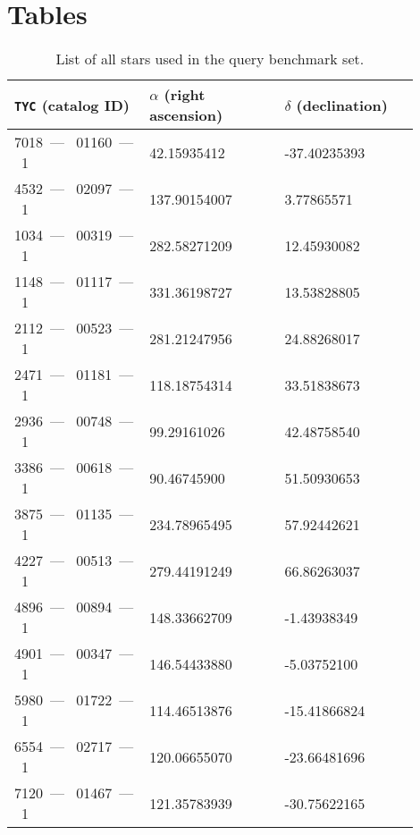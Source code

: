 \documentclass[11pt]{article}
\begin{document}
    \newpage
    \section{Tables}\label{sec:tables}
        \begin{table}[h]
        \begin{center}
            \caption{
                List of all stars used in the query benchmark set.
            } \label{tab:starsInQueries}
            \begin{tabular}{ | m{0.3\linewidth} || m{0.3\linewidth} | m{0.3\linewidth} | }
                \hline
                \texttt{TYC} (catalog ID) & $\alpha$ (right ascension) & $\delta$ (declination) \\
                \hline \hline
                7018\ --- \ 01160\ --- \ 1 & 42.15935412 & -37.40235393 \\ \hline
                4532\ --- \ 02097\ --- \ 1 & 137.90154007 & 3.77865571 \\ \hline
                1034\ --- \ 00319\ --- \ 1 & 282.58271209 & 12.45930082 \\ \hline
                1148\ --- \ 01117\ --- \ 1 & 331.36198727 & 13.53828805 \\ \hline
                2112\ --- \ 00523\ --- \ 1 & 281.21247956 & 24.88268017 \\ \hline
                2471\ --- \ 01181\ --- \ 1 & 118.18754314 & 33.51838673 \\ \hline
                2936\ --- \ 00748\ --- \ 1 & 99.29161026 & 42.48758540 \\ \hline
                3386\ --- \ 00618\ --- \ 1 & 90.46745900 & 51.50930653 \\ \hline
                3875\ --- \ 01135\ --- \ 1 & 234.78965495 & 57.92442621 \\ \hline
                4227\ --- \ 00513\ --- \ 1 & 279.44191249 & 66.86263037 \\ \hline
                4896\ --- \ 00894\ --- \ 1 & 148.33662709 & -1.43938349 \\ \hline
                4901\ --- \ 00347\ --- \ 1 & 146.54433880 & -5.03752100 \\ \hline
                5980\ --- \ 01722\ --- \ 1 & 114.46513876 & -15.41866824 \\ \hline
                6554\ --- \ 02717\ --- \ 1 & 120.06655070 & -23.66481696 \\ \hline
                7120\ --- \ 01467\ --- \ 1 & 121.35783939 & -30.75622165 \\ \hline

\end{tabular}
\end{center}
\end{table}
\end{document}
